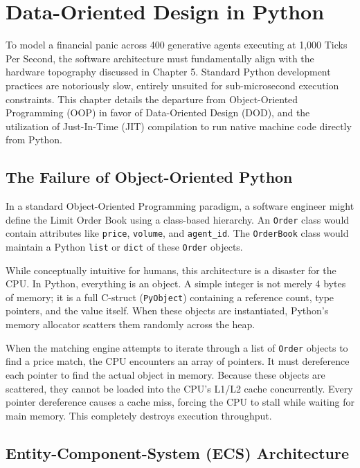 \chapter{Data-Oriented Design in Python}
\label{ch:data_oriented_design}

To model a financial panic across 400 generative agents executing at 1,000 Ticks Per Second, the software architecture must fundamentally align with the hardware topography discussed in Chapter 5. Standard Python development practices are notoriously slow, entirely unsuited for sub-microsecond execution constraints. This chapter details the departure from Object-Oriented Programming (OOP) in favor of Data-Oriented Design (DOD), and the utilization of Just-In-Time (JIT) compilation to run native machine code directly from Python.

\section{The Failure of Object-Oriented Python}

In a standard Object-Oriented Programming paradigm, a software engineer might define the Limit Order Book using a class-based hierarchy. An \texttt{Order} class would contain attributes like \texttt{price}, \texttt{volume}, and \texttt{agent\_id}. The \texttt{OrderBook} class would maintain a Python \texttt{list} or \texttt{dict} of these \texttt{Order} objects.

While conceptually intuitive for humans, this architecture is a disaster for the CPU. In Python, everything is an object. A simple integer is not merely 4 bytes of memory; it is a full C-struct (\texttt{PyObject}) containing a reference count, type pointers, and the value itself. When these objects are instantiated, Python's memory allocator scatters them randomly across the heap.

When the matching engine attempts to iterate through a list of \texttt{Order} objects to find a price match, the CPU encounters an array of pointers. It must dereference each pointer to find the actual object in memory. Because these objects are scattered, they cannot be loaded into the CPU's L1/L2 cache concurrently. Every pointer dereference causes a cache miss, forcing the CPU to stall while waiting for main memory. This completely destroys execution throughput.

\section{Entity-Component-System (ECS) Architecture}

